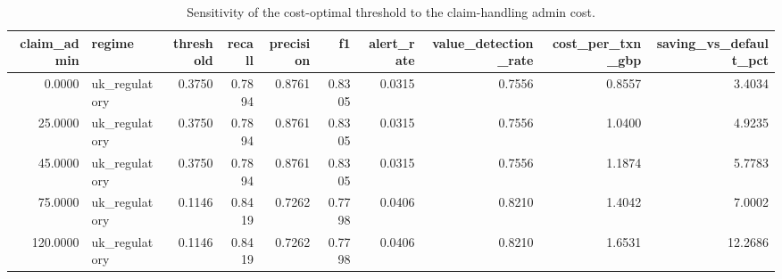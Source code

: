 \begin{table}
\caption{Sensitivity of the cost-optimal threshold to the claim-handling admin cost.}
\label{tab:table10_sensitivity_claim_admin}
\begin{tabular}{rlrrrrrrrr}
\toprule
claim\_admin & regime & threshold & recall & precision & f1 & alert\_rate & value\_detection\_rate & cost\_per\_txn\_gbp & saving\_vs\_default\_pct \\
\midrule
0.0000 & uk\_regulatory & 0.3750 & 0.7894 & 0.8761 & 0.8305 & 0.0315 & 0.7556 & 0.8557 & 3.4034 \\
25.0000 & uk\_regulatory & 0.3750 & 0.7894 & 0.8761 & 0.8305 & 0.0315 & 0.7556 & 1.0400 & 4.9235 \\
45.0000 & uk\_regulatory & 0.3750 & 0.7894 & 0.8761 & 0.8305 & 0.0315 & 0.7556 & 1.1874 & 5.7783 \\
75.0000 & uk\_regulatory & 0.1146 & 0.8419 & 0.7262 & 0.7798 & 0.0406 & 0.8210 & 1.4042 & 7.0002 \\
120.0000 & uk\_regulatory & 0.1146 & 0.8419 & 0.7262 & 0.7798 & 0.0406 & 0.8210 & 1.6531 & 12.2686 \\
\bottomrule
\end{tabular}
\end{table}
